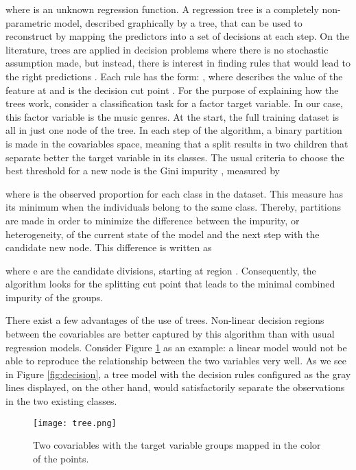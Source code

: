 \documentclass[twocolumn]{article}
\begin{document}
where  is an unknown regression function. 
A regression tree is a completely non-parametric model,
described graphically by a tree,
that can be used to reconstruct  by mapping the
predictors into a set of decisions at each step. 
On the literature, trees are applied in decision problems where there is no stochastic assumption made,
but instead, there is interest in finding 
rules that would lead to the right predictions \cite{Faraway2016}. 
Each rule has the form: ,
where  describes the value of the feature at  and  is the decision cut point
\cite{Kingsford2008}. 
For the purpose of explaining how the trees work, consider a classification task for a factor target variable.  In our case, this factor variable is
the music genres. At the start, the full training dataset is
all in just one node of the tree. In each step of the algorithm, a binary partition is made in the covariables
space, meaning that a split results in two children that
separate better the target variable in its classes. The 
usual criteria to choose the best threshold for a new node is the Gini impurity \cite{Hastie}, measured by



where  is the observed proportion for each class  in the dataset. This measure has its minimum when the individuals belong to the same class. Thereby, 
partitions are made in order to minimize the difference between the impurity, or heterogeneity, of the current state of the model and the next step with the candidate new node. This difference is written as



where  e  are the candidate divisions, starting at region . Consequently, 
the algorithm looks for the splitting
cut point that leads to the minimal
combined impurity of the groups. 

There exist a few advantages of the use of trees. 
Non-linear decision regions between the covariables are
better captured by this algorithm than with usual 
regression models. Consider Figure \ref{fig:tree} 
as an example: a linear model would not be able
to reproduce the relationship between the two 
variables very well. As we see in Figure
\ref{fig:decision}, a tree model with the 
decision rules configured as the gray lines 
displayed, on the other hand,
would satisfactorily separate 
the observations in the two existing classes. 

\begin{figure}[t]
\centering
\texttt{[image: tree.png]}
\caption{Two covariables with the target variable groups mapped in the color of the points.}
\label{fig:tree}
\end{figure}
\end{document}
